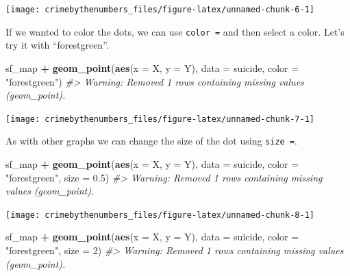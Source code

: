 \documentclass[
  12pt,
]{book}
\newenvironment{Shaded}{\begin{snugshade}}{\end{snugshade}}
\newcommand{\CommentTok}[1]{\textcolor[rgb]{0.37,0.37,0.37}{\textit{#1}}}
\newcommand{\DataTypeTok}[1]{\textcolor[rgb]{0.27,0.27,0.27}{#1}}
\newcommand{\DecValTok}[1]{\textcolor[rgb]{0.06,0.06,0.06}{#1}}
\newcommand{\FloatTok}[1]{\textcolor[rgb]{0.06,0.06,0.06}{#1}}
\newcommand{\KeywordTok}[1]{\textcolor[rgb]{0.27,0.27,0.27}{\textbf{#1}}}
\newcommand{\NormalTok}[1]{#1}
\newcommand{\OperatorTok}[1]{\textcolor[rgb]{0.43,0.43,0.43}{\textbf{#1}}}
\newcommand{\StringTok}[1]{\textcolor[rgb]{0.5,0.5,0.5}{#1}}
\begin{document}
\begin{center}\texttt{[image: crimebythenumbers\_files/figure-latex/unnamed-chunk-6-1]} \end{center}

If we wanted to color the dots, we can use \texttt{color\ =} and then select a color. Let's try it with ``forestgreen''.

\begin{Shaded}
\begin{Highlighting}[]
\NormalTok{sf\_map }\OperatorTok{+}
\StringTok{  }\KeywordTok{geom\_point}\NormalTok{(}\KeywordTok{aes}\NormalTok{(}\DataTypeTok{x =}\NormalTok{ X, }\DataTypeTok{y =}\NormalTok{ Y),}
             \DataTypeTok{data  =}\NormalTok{ suicide,}
             \DataTypeTok{color =} \StringTok{"forestgreen"}\NormalTok{)}
\CommentTok{\#\textgreater{} Warning: Removed 1 rows containing missing values (geom\_point).}
\end{Highlighting}
\end{Shaded}

\begin{center}\texttt{[image: crimebythenumbers\_files/figure-latex/unnamed-chunk-7-1]} \end{center}

As with other graphs we can change the size of the dot using \texttt{size\ =}.

\begin{Shaded}
\begin{Highlighting}[]
\NormalTok{sf\_map }\OperatorTok{+}
\StringTok{  }\KeywordTok{geom\_point}\NormalTok{(}\KeywordTok{aes}\NormalTok{(}\DataTypeTok{x =}\NormalTok{ X, }\DataTypeTok{y =}\NormalTok{ Y),}
             \DataTypeTok{data  =}\NormalTok{ suicide,}
             \DataTypeTok{color =} \StringTok{"forestgreen"}\NormalTok{,}
             \DataTypeTok{size  =} \FloatTok{0.5}\NormalTok{)}
\CommentTok{\#\textgreater{} Warning: Removed 1 rows containing missing values (geom\_point).}
\end{Highlighting}
\end{Shaded}

\begin{center}\texttt{[image: crimebythenumbers\_files/figure-latex/unnamed-chunk-8-1]} \end{center}

\begin{Shaded}
\begin{Highlighting}[]
\NormalTok{sf\_map }\OperatorTok{+}
\StringTok{  }\KeywordTok{geom\_point}\NormalTok{(}\KeywordTok{aes}\NormalTok{(}\DataTypeTok{x =}\NormalTok{ X, }\DataTypeTok{y =}\NormalTok{ Y),}
             \DataTypeTok{data  =}\NormalTok{ suicide,}
             \DataTypeTok{color =} \StringTok{"forestgreen"}\NormalTok{,}
             \DataTypeTok{size  =} \DecValTok{2}\NormalTok{)}
\CommentTok{\#\textgreater{} Warning: Removed 1 rows containing missing values (geom\_point).}
\end{Highlighting}
\end{Shaded}
\end{document}
